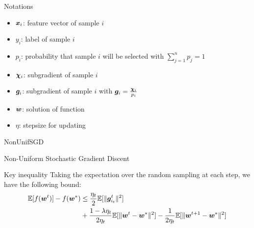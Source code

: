 \begin{frame}{Notations}
\begin{itemize}
\item $\bm{x}_i$: feature vector of sample $i$
\item $y_i$: label of sample $i$
\item $p_i$: probability that sample $i$ will be selected with $\sum_{j=1}^n p_j=1$
\item $\bm{\chi}_i$: subgradient of sample $i$
\item $\bm{g}_i$: subgradient of sample $i$ with $\bm{g}_i = \frac{\bm{\chi}_i}{p_i}$
\item $\bm{w}$: solution of function
\item $\eta$: stepsize for updating 
\end{itemize}
\end{frame}
\begin{frame}{NonUnifSGD}
\begin{algorithm}[H]
    \label{alg:SGD}
    \caption{Non-Uniform Stochastic Gradient Discent}
    \SetAlgoLined
\end{algorithm}
\end{frame}

\begin{frame}{Key inequality}
Taking the expectation over the random sampling at each step, we have the following bound:
\begin{align*}\label{neq:fworigin}
     \mathbb{E}[f(\bm{w}^{t})]-f(\bm{w}^*)   &\le  \frac{\eta_t}{2}\mathbb{E}[\|\bm{g}_{i_t}^t\|^2]  \\
    &+\frac{1-\lambda \eta_t}{2\eta_t} \mathbb{E}[\|\bm{w}^{t}-\bm{w}^*\|^2] - \frac{1}{2\eta_t}  \mathbb{E}[\|\bm{w}^{t+1} - \bm{w}^*\|^2]
\end{align*}
\end{frame}

